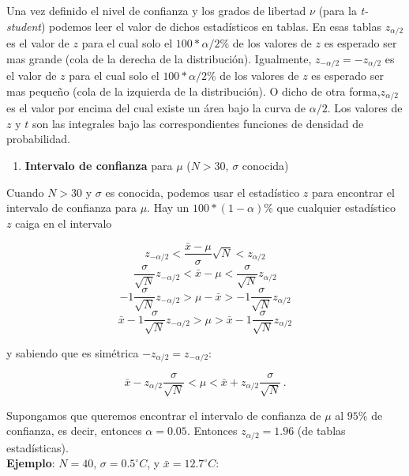 \documentclass[
]{agujournal2019}
\providecommand{\tightlist}{%
  \setlength{\itemsep}{0pt}\setlength{\parskip}{0pt}}\usepackage{longtable,booktabs,array}
\begin{document}
Una vez definido el nivel de confianza y los grados de libertad \(\nu\)
(para la \emph{t-student}) podemos leer el valor de dichos estadísticos
en tablas. En esas tablas \(z_{\alpha/2}\) es el valor de \(z\) para el
cual solo el \(100*{\alpha/2}\%\) de los valores de \(z\) es esperado
ser mas grande (cola de la derecha de la distribución). Igualmente,
\(z_{-\alpha/2}=-z_{\alpha/2}\) es el valor de \(z\) para el cual solo
el \(100*{\alpha/2}\%\) de los valores de \(z\) es esperado ser mas
pequeño (cola de la izquierda de la distribución). O dicho de otra
forma,\(z_{\alpha/2}\) es el valor por encima del cual existe un área
bajo la curva de \(\alpha/2\). Los valores de \(z\) y \(t\) son las
integrales bajo las correspondientes funciones de densidad de
probabilidad.

\begin{center}
\end{center}

\begin{enumerate}
\def\labelenumi{(\arabic{enumi})}
\tightlist
\item
  \textbf{Intervalo de confianza} para \(\mu\) (\(N>30\), \(\sigma\)
  conocida)\\
\end{enumerate}

Cuando \(N>30\) y \(\sigma\) es conocida, podemos usar el estadístico
\(z\) para encontrar el intervalo de confianza para \(\mu\). Hay un
\(100*(1-\alpha)\%\) que cualquier estadístico \(z\) caiga en el
intervalo

\[z_{-\alpha/2}<\frac{\bar{x}-\mu}{\sigma}\sqrt{N}<z_{\alpha/2}\]
\[\frac{\sigma}{\sqrt{N}}z_{-\alpha/2}<{\bar{x}-\mu}<\frac{\sigma}{\sqrt{N}}z_{\alpha/2}\]
\[-1\frac{\sigma}{\sqrt{N}}z_{-\alpha/2}>{\mu-\bar{x}}>-1\frac{\sigma}{\sqrt{N}}z_{\alpha/2}\]
\[\bar{x}-1\frac{\sigma}{\sqrt{N}}z_{-\alpha/2}>\mu>\bar{x}-1\frac{\sigma}{\sqrt{N}}z_{\alpha/2}\]

y sabiendo que es simétrica \(-z_{\alpha/2}=z_{-\alpha/2}\):

\[\bar{x}-z_{\alpha/2}\frac{\sigma}{\sqrt{N}} < \mu <
   \bar{x}+z_{\alpha/2}\frac{\sigma}{\sqrt{N}}\,.\]

Supongamos que queremos encontrar el intervalo de confianza de \(\mu\)
al \(95\%\) de confianza, es decir, entonces \(\alpha=0.05\). Entonces
\(z_{\alpha/2}=1.96\) (de tablas estadísticas).\\

\textbf{Ejemplo}: \(N=40\), \(\sigma=0.5^\circ{C}\), y
\(\bar{x}=12.7^\circ{C}\):
\end{document}
